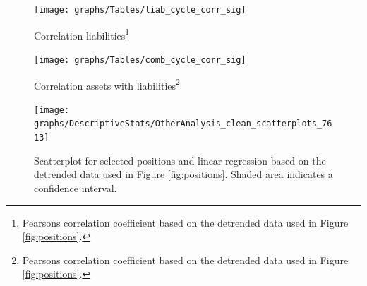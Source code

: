 \documentclass[12pt, a4paper]{article} %
\begin{document}
\begin{figure}[H]
\begin{minipage}{\textwidth}
\centering
\caption[1]{Correlation liabilities\footnote{Pearsons correlation coefficient based on the detrended data used in Figure \ref{fig:positions}.} }
\texttt{[image: graphs/Tables/liab\_cycle\_corr\_sig]}
\label{fig:corr_liab}
\end{minipage}
\end{figure}

\begin{figure}[H]
\begin{minipage}{\textwidth}
\centering
\caption[1]{Correlation assets with liabilities\footnote{Pearsons correlation coefficient based on the detrended data used in Figure \ref{fig:positions}.} }
\texttt{[image: graphs/Tables/comb\_cycle\_corr\_sig]}
\label{fig:corr_comb}
\end{minipage}
\end{figure}
\fi

\begin{figure}[H]
\begin{minipage}{\textwidth}
\centering
\texttt{[image: graphs/DescriptiveStats/OtherAnalysis\_clean\_scatterplots\_7613]}
\caption[1]{Scatterplot for selected positions and linear regression based on the detrended data used in Figure \ref{fig:positions}. Shaded area indicates a confidence interval.}
\label{fig:scatterplots}
\end{minipage}
\end{figure}
\end{document}
